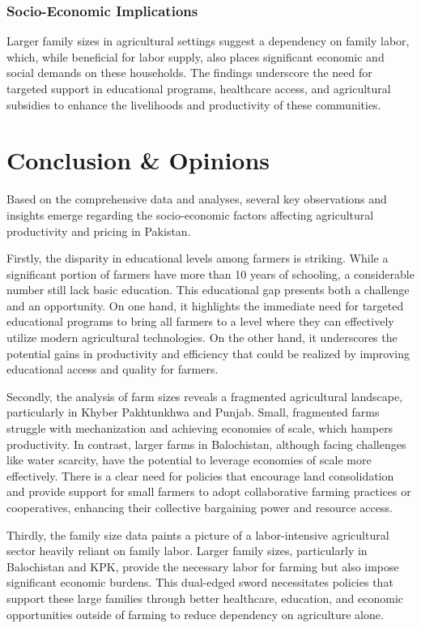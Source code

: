 \documentclass[12pt]{article}
\begin{document}
\subsubsection{Socio-Economic Implications}
Larger family sizes in agricultural settings suggest a dependency on family labor, which, while beneficial for labor supply, also places significant economic and social demands on these households. The findings underscore the need for targeted support in educational programs, healthcare access, and agricultural subsidies to enhance the livelihoods and productivity of these communities.

\section*{Conclusion \& Opinions}
Based on the comprehensive data and analyses, several key observations and insights emerge regarding the socio-economic factors affecting agricultural productivity and pricing in Pakistan.

Firstly, the disparity in educational levels among farmers is striking. While a significant portion of farmers have more than 10 years of schooling, a considerable number still lack basic education. This educational gap presents both a challenge and an opportunity. On one hand, it highlights the immediate need for targeted educational programs to bring all farmers to a level where they can effectively utilize modern agricultural technologies. On the other hand, it underscores the potential gains in productivity and efficiency that could be realized by improving educational access and quality for farmers.

Secondly, the analysis of farm sizes reveals a fragmented agricultural landscape, particularly in Khyber Pakhtunkhwa and Punjab. Small, fragmented farms struggle with mechanization and achieving economies of scale, which hampers productivity. In contrast, larger farms in Balochistan, although facing challenges like water scarcity, have the potential to leverage economies of scale more effectively. There is a clear need for policies that encourage land consolidation and provide support for small farmers to adopt collaborative farming practices or cooperatives, enhancing their collective bargaining power and resource access.

Thirdly, the family size data paints a picture of a labor-intensive agricultural sector heavily reliant on family labor. Larger family sizes, particularly in Balochistan and KPK, provide the necessary labor for farming but also impose significant economic burdens. This dual-edged sword necessitates policies that support these large families through better healthcare, education, and economic opportunities outside of farming to reduce dependency on agriculture alone.
\end{document}
